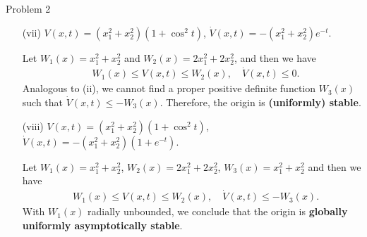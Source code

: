 \documentclass[8pt]{beamer}
\begin{document}
\begin{frame}[t]{Problem 2}
  \begin{itemize}
    \item[(vii)] $V(x,t)=(x_1^2+x_2^2)(1+\cos^2t)$, $\dot V(x,t)=-(x_1^2+x_2^2)e^{-t}$.
    
    Let $W_1(x)=x_1^2+x_2^2$ and $W_2(x)=2x_1^2+2x_2^2$, and then we have 
    \begin{align*}
        &W_1(x) \le V(x,t) \le W_2(x),\quad \dot V(x,t) \le 0.
    \end{align*}
    Analogous to (ii), we cannot find a proper positive definite function $W_3(x)$ such that $\dot V(x,t) \le -W_3(x)$. Therefore, the origin is \textbf{(uniformly) stable}.

    \item[(viii)] $V(x,t)=(x_1^2+x_2^2)(1+\cos^2t)$, $\dot V(x,t)=-(x_1^2+x_2^2)(1+e^{-t})$.
    
    Let $W_1(x)=x_1^2+x_2^2$, $W_2(x)=2x_1^2+2x_2^2$, $W_3(x)=x_1^2+x_2^2$ and then we have 
    \begin{align*}
        &W_1(x) \le V(x,t) \le W_2(x) ,\quad \dot V(x,t) \le -W_3(x).
    \end{align*}
    With $W_1(x)$ radially unbounded, we conclude that the origin is \textbf{globally uniformly asymptotically stable}.

  \end{itemize}
\end{frame}
\end{document}
